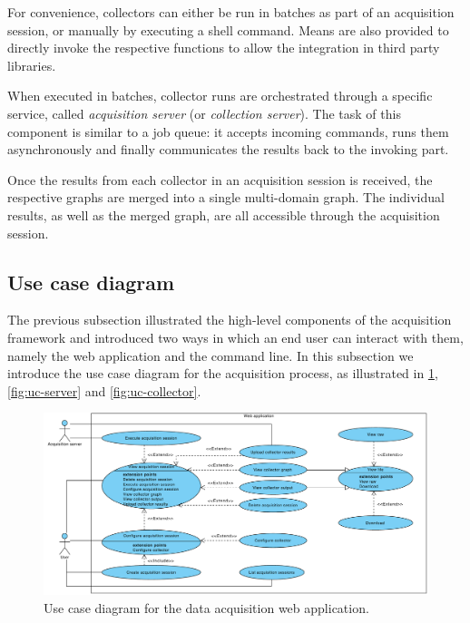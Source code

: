 For convenience, collectors can either be run in batches as part of an acquisition session, or manually by executing a shell command. Means are also provided to directly invoke the respective functions to allow the integration in third party libraries.

When executed in batches, collector runs are orchestrated through a specific service, called \emph{acquisition server} (or \emph{collection server}). The task of this component is similar to a job queue: it accepts incoming commands, runs them asynchronously and finally communicates the results back to the invoking part.

Once the results from each collector in an acquisition session is received, the respective graphs are merged into a single multi-domain graph. The individual results, as well as the merged graph, are all accessible through the acquisition session.

\subsection{Use case diagram}

The previous subsection illustrated the high-level components of the acquisition framework and introduced two ways in which an end user can interact with them, namely the web application and the command line. In this subsection we introduce the use case diagram for the acquisition process, as illustrated in \ref{fig:uc-acquisition}, \ref{fig:uc-server} and \vref{fig:uc-collector}.

\begin{figure}[p]
  \begin{adjustwidth}{-2.2cm}{-1.5cm}
  \includegraphics[width=\linewidth]{images/diagrams/uc-acquisition}
  \end{adjustwidth}

  \caption[Use case diagram for the data acquisition web application.]{Use case diagram for the data acquisition web application.}
  \label{fig:uc-acquisition}
\end{figure}

